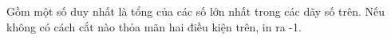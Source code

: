 Gồm một số duy nhất là tổng của các số lớn nhất trong các dãy số trên. Nếu không có cách cắt nào thỏa mãn hai điều kiện trên, in ra -1.  

\